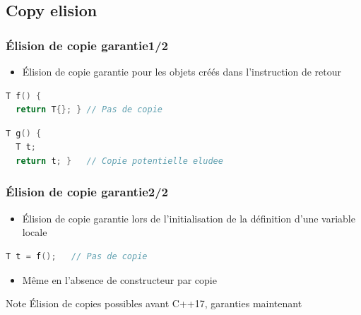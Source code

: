 \documentclass[C++.tex]{subfiles}
\begin{document}
\subsection*{Copy elision}
\begin{frame}[fragile]
	\frametitle{Élision de copie garantie\titlehfill{}1/2}
	\begin{itemize}
		\item Élision de copie garantie pour les objets créés dans l'instruction de retour
	\end{itemize}

	\begin{lstlisting}[language=C++]
T f() {
  return T{}; } // Pas de copie\end{lstlisting}

	\begin{lstlisting}[language=C++]
T g() {
  T t;
  return t; }   // Copie potentielle eludee\end{lstlisting}
\end{frame}

\begin{frame}[fragile]
	\frametitle{Élision de copie garantie\titlehfill{}2/2}

	\begin{itemize}
		\item Élision de copie garantie  lors de l'initialisation de la définition d'une variable locale
	\end{itemize}

	\begin{lstlisting}[language=C++]
T t = f();   // Pas de copie\end{lstlisting}

	\begin{itemize}
		\item Même en l'absence de constructeur par copie
	\end{itemize}

	\begin{block}{Note}
		Élision de copies possibles avant C++17, garanties maintenant
	\end{block}
\end{frame}
\end{document}
